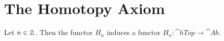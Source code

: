 \section{The Homotopy Axiom}

\begin{theorem}
	Let $n \in \mathbb{Z}$. Then the functor $H_n$ induces a functor $H_n : \cat{hTop} \to \cat{Ab}$.
\end{theorem}

